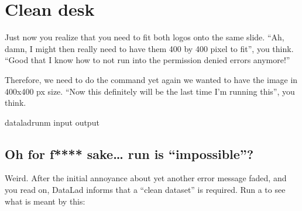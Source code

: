 \sphinxstepscope


\section{Clean desk}
\label{\detokenize{basics/101-112-run4:clean-desk}}\label{\detokenize{basics/101-112-run4:run5}}\label{\detokenize{basics/101-112-run4::doc}}
\sphinxAtStartPar
Just now you realize that you need to fit both logos onto the same slide.
“Ah, damn, I might then really need to have them 400 by 400 pixel to fit”,
you think. “Good that I know how to not run into the permission denied errors anymore!”

\sphinxAtStartPar
Therefore, we need to do the  command yet again \sphinxhyphen{} we wanted to have
the image in 400x400 px size. “Now this definitely will be the last time I’m running this”,
you think.

%
\begin{sphinxVerbatim}[commandchars=\\\{\}]
dataladrun\PYGZhy{}m
\PYGZhy{}\PYGZhy{}input
\PYGZhy{}\PYGZhy{}output
\end{sphinxVerbatim}
\sphinxresetverbatimhllines


\subsection{Oh for f**** sake… run is “impossible”?}
\label{\detokenize{basics/101-112-run4:oh-for-f-sake-run-is-impossible}}
\sphinxAtStartPar
Weird. After the initial annoyance about yet another error message faded,
and you read on,
DataLad informs that a “clean dataset” is required.
Run a  to see what is meant by this:

